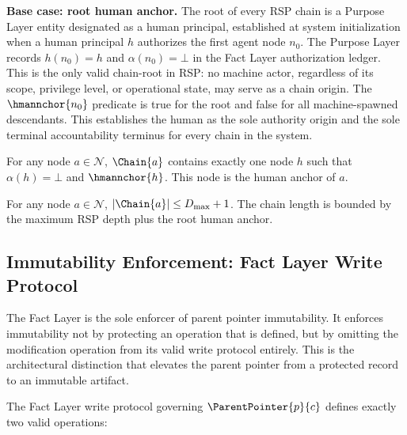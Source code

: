 \bigskip
\noindent\textbf{Base case: root human anchor.} The root of every RSP chain is a Purpose Layer entity designated as a human principal, established at system initialization when a human principal $h$ authorizes the first agent node $n_0$. The Purpose Layer records $h(n_0) = h$ and $\alpha(n_0) = \bot$ in the Fact Layer authorization ledger. This is the only valid chain-root in RSP: no machine actor, regardless of its scope, privilege level, or operational state, may serve as a chain origin. The $\hmannchor{n_0}$ predicate is true for the root and false for all machine-spawned descendants. This establishes the human as the sole authority origin and the sole terminal accountability terminus for every chain in the system.

\begin{corol}
\label{corol:chain-terminates-human}
For any node $a \in \mathcal{N}$, $\Chain{a}$ contains exactly one node $h$ such that $\alpha(h) = \bot$ and $\hmannchor{h}$. This node is the human anchor of $a$.
\end{corol}

\begin{corol}
\label{corol:chain-finite}
For any node $a \in \mathcal{N}$, $|\Chain{a}| \leq D_{\max} + 1$. The chain length is bounded by the maximum RSP depth plus the root human anchor.
\end{corol}

\subsection{Immutability Enforcement: Fact Layer Write Protocol}
\label{sec:fact-layer-immutability}

The Fact Layer is the sole enforcer of parent pointer immutability. It enforces immutability not by protecting an operation that is defined, but by omitting the modification operation from its valid write protocol entirely. This is the architectural distinction that elevates the parent pointer from a protected record to an immutable artifact.

The Fact Layer write protocol governing $\ParentPointer{p}{c}$ defines exactly two valid operations:

